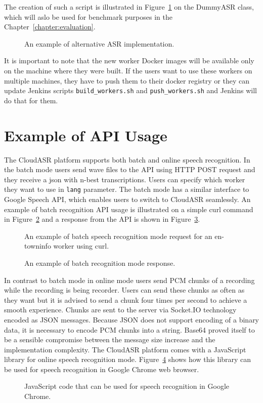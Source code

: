 The creation of such a script is illustrated in Figure~\ref{fig:dummyasr} on the DummyASR class,
  which will aslo be used for benchmark purposes in the Chapter~\ref{chapter:evaluation}.

\begin{figure}[h]
  

  \caption{An example of alternative ASR implementation.}
  \label{fig:dummyasr}
\end{figure}


It is important to note that the new worker Docker images will be available only on the machine
  where they were built.
If the users want to use these workers on multiple machines, they have to push them to their docker registry
  or they can update Jenkins scripts \texttt{build\_workers.sh} and \texttt{push\_workers.sh}
  and Jenkins will do that for them.


\section{Example of API Usage}
The CloudASR platform supports both batch and online speech recognition.
In the batch mode users send wave files to the API using HTTP POST request
  and they receive a json with n-best transcriptions.
Users can specify which worker they want to use in \texttt{lang} parameter.
The batch mode has a similar interface to Google Speech API,
  which enables users to switch to CloudASR seamlessly.
An example of batch recognition API usage is illustrated on a simple curl command in Figure~\ref{fig:curl}
  and a response from the API is shown in Figure~\ref{fig:curl-response}.

\begin{figure}[h]
  

  \caption{An example of batch speech recognition mode request for an en-towninfo worker using curl.}
  \label{fig:curl}
\end{figure}

\begin{figure}[h]
  

  \caption{An example of batch recognition mode response.}
  \label{fig:curl-response}
\end{figure}

In contrast to batch mode in online mode users send PCM chunks of a recording while the recording is being recorder.
Users can send these chunks as often as they want
  but it is advised to send a chunk four times per second
  to achieve a smooth experience.
Chunks are sent to the server via Socket.IO technology encoded as JSON messages.
Because JSON does not support encoding of a binary data,
  it is necessary to encode PCM chunks into a string.
Base64 proved itself to be a sensible compromise between the message size increase
  and the implementation complexity.
The CloudASR platform comes with a JavaScript library for online speech recognition mode.
Figure~\ref{fig:online} shows how this library can be used for speech recognition in Google Chrome web browser.

\begin{figure}[T]
  

  \caption{JavaScript code that can be used for speech recognition in Google Chrome.}
  \label{fig:online}
  \vspace*{6in}
\end{figure}
